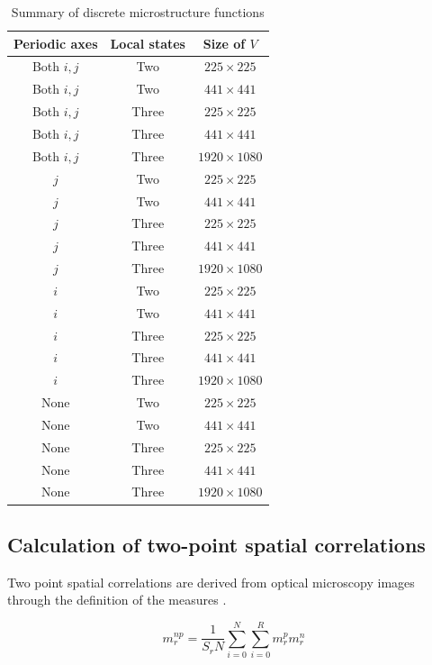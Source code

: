 \begin{table}
  \caption{Summary of discrete microstructure functions}
  \centering
  \begin{tabular}{c c c}
    \hline\hline
    Periodic axes & Local states & Size of $V$ \\
    \hline
    Both $i, j$ & Two & $225 \times 225$ \\
    Both $i, j$ & Two & $441 \times 441$ \\
    Both $i, j$ & Three & $225 \times 225$ \\
    Both $i, j$ & Three & $441 \times 441$ \\
    Both $i, j$ & Three & $1920 \times 1080$ \\
    \hline
    $j$ & Two & $225 \times 225$ \\
    $j$ & Two & $441 \times 441$ \\
    $j$ & Three & $225 \times 225$ \\
    $j$ & Three & $441 \times 441$ \\
    $j$ & Three & $1920 \times 1080$ \\
    \hline
    $i$ & Two & $225 \times 225$ \\
    $i$ & Two & $441 \times 441$ \\
    $i$ & Three & $225 \times 225$ \\
    $i$ & Three & $441 \times 441$ \\
    $i$ & Three & $1920 \times 1080$ \\
    \hline
    None & Two & $225 \times 225$ \\
    None & Two & $441 \times 441$ \\
    None & Three & $225 \times 225$ \\
    None & Three & $441 \times 441$ \\
    None & Three & $1920 \times 1080$ \\[1ex]
  \end{tabular}
  \label{tab:fxns}
\end{table}

\subsection{Calculation of two-point spatial correlations}
Two point spatial correlations are derived from optical microscopy images through the definition of the measures \cite{gupta15}.

\[
  m^{np}_r = \dfrac{1}{S_rN} \sum_{i=0}^{N} \sum_{i=0}^{R} m^p_r m^n_r
\]

